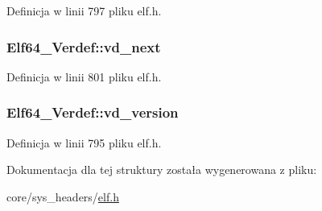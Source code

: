 Definicja w linii 797 pliku elf.\-h.

\hypertarget{struct_elf64___verdef_a9cebd5131a542990d3130489a3b4acec}{
\subsubsection[{vd\-\_\-next}]{ Elf64\-\_\-\-Verdef\-::vd\-\_\-next}}\label{struct_elf64___verdef_a9cebd5131a542990d3130489a3b4acec}


Definicja w linii 801 pliku elf.\-h.

\hypertarget{struct_elf64___verdef_afe15c8d72df394443deb40da61df3459}{
\subsubsection[{vd\-\_\-version}]{ Elf64\-\_\-\-Verdef\-::vd\-\_\-version}}\label{struct_elf64___verdef_afe15c8d72df394443deb40da61df3459}


Definicja w linii 795 pliku elf.\-h.



Dokumentacja dla tej struktury została wygenerowana z pliku\-:\begin{DoxyCompactItemize}
\item 
core/sys\-\_\-headers/\hyperlink{elf_8h}{elf.\-h}\end{DoxyCompactItemize}
